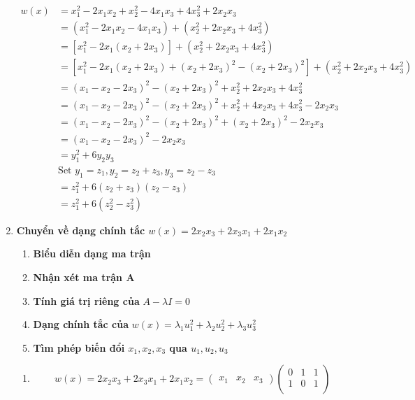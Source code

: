 \begin{enumerate}
\begin{align*}
        w(x) &= x_1^2 - 2x_1x_2 + x_2^2 - 4x_1x_3 + 4x_3^2 + 2x_2x_3\\
        &= (x_1^2 - 2x_1x_2 - 4x_1x_3) + (x_2^2 + 2x_2x_3 + 4x_3^2)\\
        &= [x_1^2 - 2x_1(x_2 + 2x_3)] + (x_2^2 + 2x_2x_3 + 4x_3^2)\\
        &= [x_1^2 - 2x_1(x_2 + 2x_3) + (x_2 + 2x_3)^2 - (x_2 + 2x_3)^2] + (x_2^2 + 2x_2x_3 + 4x_3^2)\\
        &= (x_1 - x_2 - 2x_3)^2 - (x_2 + 2x_3)^2 + x_2^2 + 2x_2x_3 + 4x_3^2\\
        &= (x_1 - x_2 - 2x_3)^2 - (x_2 + 2x_3)^2 + x_2^2 + 4x_2x_3 + 4x_3^2 - 2x_2x_3\\
        &= (x_1 - x_2 - 2x_3)^2 - (x_2 + 2x_3)^2 + (x_2 + 2x_3)^2 - 2x_2x_3\\
        &= (x_1 - x_2 - 2x_3)^2 - 2x_2x_3\\
        &= y_1^2 + 6y_2y_3\\
        &\textrm{Set } y_1 = z_1, y_2 = z_2 + z_3, y_3 = z_2 - z_3\\
        &= z_1^2 + 6(z_2 + z_3)(z_2 - z_3)\\
        &= z_1^2 + 6(z_2^2 - z_3^2)
    \end{align*}
    \item \textbf{Chuyển về dạng chính tắc $w(x) = 2x_2x_3 + 2x_3x_1 + 2x_1x_2$}
    \begin{enumerate}
        \item \textbf{Biểu diễn dạng ma trận}
        \item \textbf{Nhận xét ma trận A}
        \item \textbf{Tính giá trị riêng của} $A - \lambda I = 0$
        \item \textbf{Dạng chính tắc của} $w(x) = \lambda_1u_1^2 + \lambda_2u_2^2 + \lambda_3u_3^2$
        \item \textbf{Tìm phép biến đổi $x_1, x_2, x_3$ qua $u_1, u_2, u_3$}
    \end{enumerate}
    \begin{enumerate}
        \item \begin{equation*}
            w(x) = 2x_2x_3 + 2x_3x_1 + 2x_1x_2
            = \begin{pmatrix}
                x_1 & x_2 & x_3
            \end{pmatrix}
            \begin{pmatrix}
                0 & 1 & 1\\
                1 & 0 & 1\\

\end{pmatrix}
\end{equation*}
\end{enumerate}
\end{enumerate}
